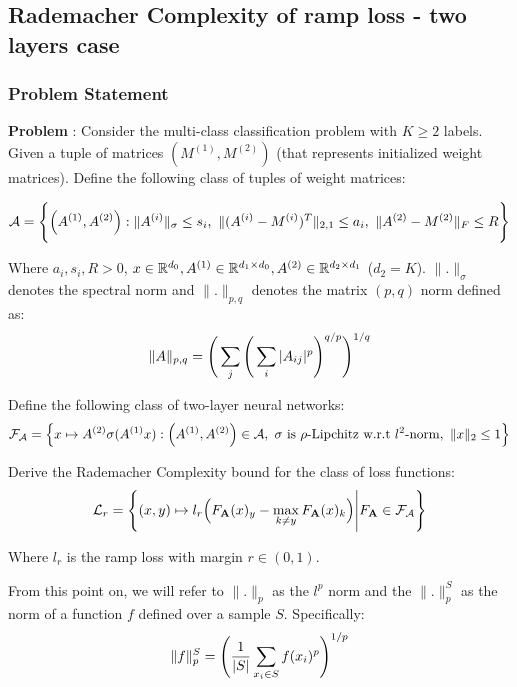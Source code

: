 \newpage
\subsection{Rademacher Complexity of ramp loss - two layers case}
\subsubsection{Problem Statement}
\textbf{Problem} : Consider the multi-class classification problem with $K \ge 2$ labels. Given a tuple of matrices $(M^{(1)}, M^{(2)})$ (that represents initialized weight matrices). Define the following class of tuples of weight matrices:

\begin{align*}
    \mathcal{A} = \Bigg\{ 
        \Big( 
            A^{(1)}, A^{(2)}
         \Big) : \|A^{(i)}\|_\sigma \le s_i, \ \| (A^{(i)} - M^{(i)})^T \|_{2, 1} \le a_i, \ \| A^{(2)} - M^{(2)} \|_F \le R
     \Bigg\}
\end{align*}

\noindent Where $a_i, s_i, R > 0$, $x\in \mathbb{R}^{d_0}, A^{(1)}\in\mathbb{R}^{d_1\times d_0}, A^{(2)}\in \mathbb{R}^{d_2\times d_1}$ ($d_2=K$). $\|.\|_\sigma$ denotes the spectral norm and $\|.\|_{p, q}$ denotes the matrix $(p, q)$ norm defined as:
\begin{align*}
    \|A\|_{p, q} = \Bigg( \sum_j\Bigg( \sum_{i}|A_{ij}|^p \Bigg)^{q/p} \Bigg)^{1/q}
\end{align*}    

\noindent Define the following class of two-layer neural networks:
\begin{align*}
    \mathcal{F}_\mathcal{A} = \Big\{ 
        x\mapsto A^{(2)}\sigma(A^{(1)}x) : \Big( A^{(1)}, A^{(2)} \Big)\in\mathcal{A}, \ \sigma \text{ is } \rho\text{-Lipchitz w.r.t } l^2\text{-norm}, \ \|x\|_2 \le 1
     \Big\}
\end{align*}

\noindent Derive the Rademacher Complexity bound for the class of loss functions:
\begin{align*}
    \mathcal{L}_r = \Bigg\{ 
        (x, y) \mapsto l_r\Big( 
            F_{\bf A}(x)_y - \max_{k\ne y}F_{\bf A}(x)_k
         \Big) \Bigg| F_{\bf A} \in \mathcal{F}_\mathcal{A}
     \Bigg\}
\end{align*}

\noindent Where $l_r$ is the ramp loss with margin $r\in(0,1)$.

\noindent \color{red}
From this point on, we will refer to $\|.\|_p$ as the $l^p$ norm and the $\|.\|_p^S$ as the norm of a function $f$ defined over a sample $S$. Specifically:
\begin{align*}
    \|f\|_p^S = \Bigg( 
        \frac{1}{|S|}\sum_{x_i \in S} f(x_i) ^p
     \Bigg)^{1/p}
\end{align*}
\color{black}

